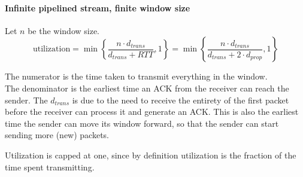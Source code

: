 \documentclass[a4paper]{article}
\newcommand{\set}[1]{\left\lbrace#1\right\rbrace} %
\begin{document}
\paragraph{Infinite pipelined stream, finite window size} Let $n$ be the window size.
\begin{equation}
	\text{utilization} = \min\set{\frac{n\cdot d_{trans}}{d_{trans} + RTT}, 1} = \min\set{\frac{n\cdot d_{trans}}{d_{trans} + 2\cdot d_{prop}}, 1}
\end{equation}

The numerator is the time taken to transmit everything in the window.\\
The denominator is the earliest time an ACK from the receiver can reach the sender. The $d_{trans}$ is due to the need to receive the entirety of the first packet before the receiver can process it and generate an ACK. This is also the earliest time the sender can move its window forward, so that the sender can start sending more (new) packets.

Utilization is capped at one, since by definition utilization is the fraction of the time spent transmitting.
\end{document}
